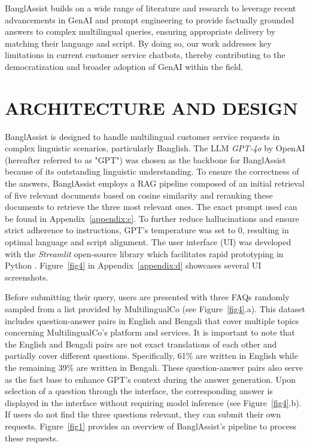 \documentclass[sigconf]{acmart}
\begin{document}
BanglAssist builds on a wide range of literature and research to leverage recent advancements in GenAI and prompt engineering to provide factually grounded answers to complex multilingual queries, ensuring appropriate delivery by matching their language and script. By doing so, our work addresses key limitations in current customer service chatbots, thereby contributing to the democratization and broader adoption of GenAI within the field.


\section{ARCHITECTURE AND DESIGN}

BanglAssist is designed to handle multilingual customer service requests in complex linguistic scenarios, particularly Banglish. The LLM \textit{GPT-4o} by OpenAI \cite{gpt4o}(hereafter referred to as "GPT") was chosen as the backbone for BanglAssist because of its outstanding linguistic understanding. To ensure the correctness of the answers, BanglAssist employs a RAG pipeline composed of an initial retrieval of five relevant documents based on cosine similarity and reranking these documents to retrieve the three most relevant ones. The exact prompt used can be found in Appendix~\ref{appendix:c}. To further reduce hallucinations and ensure strict adherence to instructions, GPT's temperature was set to 0, resulting in optimal language and script alignment. The user interface (UI) was developed with the \textit{Streamlit} open-source library which facilitates rapid prototyping in Python \cite{streamlit}. Figure~\ref{fig4} in Appendix~\ref{appendix:d} showcases several UI screenshots.

Before submitting their query, users are presented with three FAQs randomly sampled from a list provided by MultilingualCo (see Figure~\ref{fig4}.a). This dataset includes question-answer pairs in English and Bengali that cover multiple topics concerning MultilingualCo's platform and services. It is important to note that the English and Bengali pairs are not exact translations of each other and partially cover different questions. Specifically, 61\% are written in English while the remaining 39\% are written in Bengali. These question-answer pairs also serve as the fact base to enhance GPT's context during the answer generation. Upon selection of a question through the interface, the corresponding answer is displayed in the interface without requiring model inference (see Figure~\ref{fig4}.b). If users do not find the three questions relevant, they can submit their own requests. Figure~\ref{fig1} provides an overview of BanglAssist's pipeline to process these requests.
\end{document}
